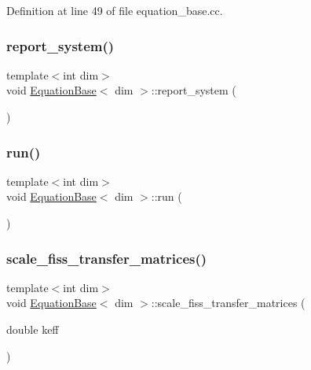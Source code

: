 Definition at line 49 of file equation\+\_\+base.\+cc.

\mbox{\label{class_equation_base_a9b4d33dbf86898d75754a22fda9c9e98}} 
\subsubsection{\texorpdfstring{report\+\_\+system()}{report\_system()}}
{\footnotesize\ttfamily template$<$int dim$>$ \\
void \hyperlink{class_equation_base}{Equation\+Base}$<$ dim $>$\+::report\+\_\+system (\begin{DoxyParamCaption}{ }\end{DoxyParamCaption})\hspace{0.3cm}{\ttfamily [private]}}

\mbox{\label{class_equation_base_a7692b87c807ce4ed5081dab4dc28decb}} 
\subsubsection{\texorpdfstring{run()}{run()}}
{\footnotesize\ttfamily template$<$int dim$>$ \\
void \hyperlink{class_equation_base}{Equation\+Base}$<$ dim $>$\+::run (\begin{DoxyParamCaption}{ }\end{DoxyParamCaption})}

\mbox{\label{class_equation_base_a13947db6be48085b9dca97117c73b5ca}} 
\subsubsection{\texorpdfstring{scale\+\_\+fiss\+\_\+transfer\+\_\+matrices()}{scale\_fiss\_transfer\_matrices()}}
{\footnotesize\ttfamily template$<$int dim$>$ \\
void \hyperlink{class_equation_base}{Equation\+Base}$<$ dim $>$\+::scale\+\_\+fiss\+\_\+transfer\+\_\+matrices (\begin{DoxyParamCaption}\item[{double}]{keff }\end{DoxyParamCaption})}




